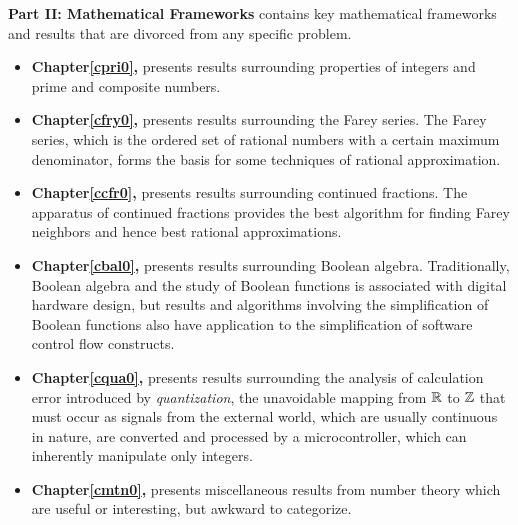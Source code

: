 \textbf{Part II:  Mathematical Frameworks}
contains key mathematical frameworks and
results that are divorced from any specific problem.
\begin{itemize}
\item \textbf{Chapter\;\ref{cpri0}, \cprizerotitle{}} presents results surrounding
      properties of integers and prime and composite numbers.
\item \textbf{Chapter\;\ref{cfry0}, \cfryzerotitle{}} presents results surrounding
      the Farey series.  The Farey series, which is the 
      ordered set of rational numbers with a certain maximum denominator,
      forms the basis for some techniques of rational approximation.
\item \textbf{Chapter\;\ref{ccfr0}, \ccfrzerotitle{}} presents results surrounding
      continued fractions.  The apparatus of continued
      fractions provides the best algorithm for finding Farey neighbors and hence
      best rational approximations.
\item \textbf{Chapter\;\ref{cbal0}, \cbalzerotitle{}} presents results surrounding
      Boolean algebra.  Traditionally, Boolean algebra and the study of Boolean
      functions is associated with digital hardware design, but results and
      algorithms involving the simplification of Boolean functions also have
      application to the simplification of software control flow constructs.
\item \textbf{Chapter\;\ref{cqua0}, \cquazerotitle{}} presents results surrounding
      the analysis of calculation error introduced by \emph{quantization}, the
      unavoidable mapping from ${\mathbb{R}}{}$ to ${\mathbb{Z}}{}$ that must occur
      as signals from the external world, which are usually continuous in nature,
      are converted and processed by a microcontroller, which can inherently manipulate
      only integers.
\item \textbf{Chapter\;\ref{cmtn0}, \cmtnzerotitle{}} presents miscellaneous results
      from number theory which are useful or interesting, but awkward to
      categorize.
\end{itemize}


